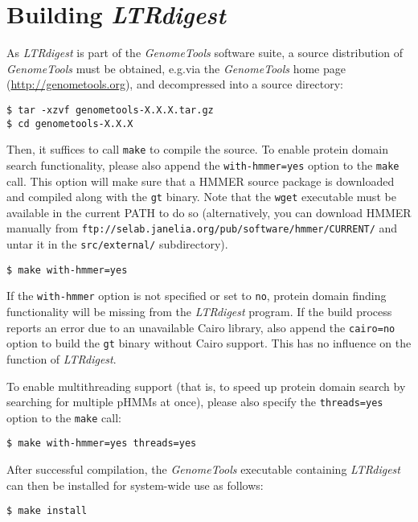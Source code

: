 \documentclass[12pt,titlepage]{article}
\newcommand{\LTRdigest}{\textit{LTRdigest}\xspace}
\newcommand{\GenomeTools}{\textit{GenomeTools}\xspace}
\newcommand{\Gt}{\texttt{gt}\xspace}
\begin{document}
\section{Building \emph{LTRdigest}} \label{Building}

As \LTRdigest is part of the \GenomeTools software suite, a source distribution
of \GenomeTools must be obtained, e.g.\@ via the \GenomeTools home page
(\url{http://genometools.org}), and decompressed into a source directory:

\begin{verbatim}
$ tar -xzvf genometools-X.X.X.tar.gz
$ cd genometools-X.X.X
\end{verbatim}

Then, it suffices to call \texttt{make} to compile the source. To enable protein
domain search functionality, please also append the \texttt{with-hmmer=yes}
option to the \texttt{make} call. This option will make sure that a HMMER source
package is downloaded and compiled along with the \Gt binary. Note that the
\texttt{wget} executable must be available in the current PATH to do so
(alternatively, you can download HMMER manually from
\texttt{ftp://selab.janelia.org/pub/software/hmmer/CURRENT/} and untar it in the
\texttt{src/external/} subdirectory).

\begin{verbatim}
$ make with-hmmer=yes
\end{verbatim}%

If the \texttt{with-hmmer} option is not specified or set to \texttt{no},
protein domain finding functionality will be missing from the \LTRdigest
program. If the build process reports an error due to an unavailable Cairo
library, also append the \texttt{cairo=no} option to build the \Gt binary
without Cairo support. This has no influence on the function of \LTRdigest .

To enable multithreading support (that is, to speed up protein domain search by
searching for multiple pHMMs at once), please also specify the
\texttt{threads=yes} option to the \texttt{make} call:

\begin{verbatim}
$ make with-hmmer=yes threads=yes
\end{verbatim}%

After successful compilation, the \GenomeTools executable containing \LTRdigest
can then be installed for system-wide use as follows:

\begin{verbatim}
$ make install
\end{verbatim}%
\end{document}
